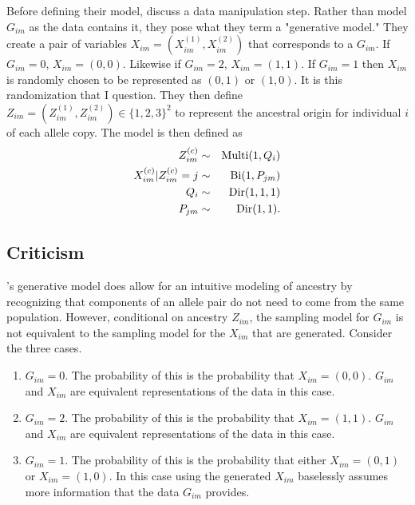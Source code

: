 \documentclass{article}
\begin{document}
Before defining their model, \citeauthor{efron2016CASI} discuss a data manipulation step. Rather than model $G_{im}$ as the data contains it, they pose what they term a "generative model." They create a pair of variables $X_{im} = (X_{im}^{(1)}, X_{im}^{(2)})$ that corresponds to a $G_{im}$. If $G_{im} = 0$, $X_{im} = (0, 0)$. Likewise if $G_{im} = 2$, $X_{im} = (1,1)$. If $G_{im} = 1$ then $X_{im}$ is randomly chosen to be represented as $(0, 1)$ or $(1, 0)$. It is this randomization that I question. They then define $Z_{im} = (Z_{im}^{(1)}, Z_{im}^{(2)}) \in \{1, 2, 3\}^2$ to represent the ancestral origin for individual $i$ of each allele copy. The model is then defined as
\begin{eqnarray}
Z_{im}^{(c)} &\sim& \text{Multi}(1, Q_i)\\
X_{im}^{(c)} | Z_{im}^{(c)} = j &\sim& \text{Bi}(1, P_{jm}) \notag\\
Q_i &\sim& \text{Dir}(1, 1, 1) \notag\\
P_{jm} &\sim& \text{Dir}(1,1). \notag
\end{eqnarray}

\subsection{Criticism}

\citeauthor{efron2016CASI}'s generative model does allow for an intuitive modeling of ancestry by recognizing that components of an allele pair do not need to come from the same population. However, conditional on ancestry $Z_{im}$, the sampling model for $G_{im}$ is not equivalent to the sampling model for the $X_{im}$ that are generated. Consider the three cases.

\begin{enumerate}
    \item $G_{im} = 0$. The probability of this is the probability that $X_{im} = (0, 0)$. $G_{im}$ and $X_{im}$ are equivalent representations of the data in this case.
    \item $G_{im} = 2$. The probability of this is the probability that $X_{im} = (1, 1)$. $G_{im}$ and $X_{im}$ are equivalent representations of the data in this case.
    \item $G_{im} = 1$. The probability of this is the probability that either $X_{im} = (0, 1)$ or $X_{im} = (1, 0)$. In this case using the generated $X_{im}$ baselessly assumes more information that the data $G_{im}$ provides.
\end{enumerate}
\end{document}
